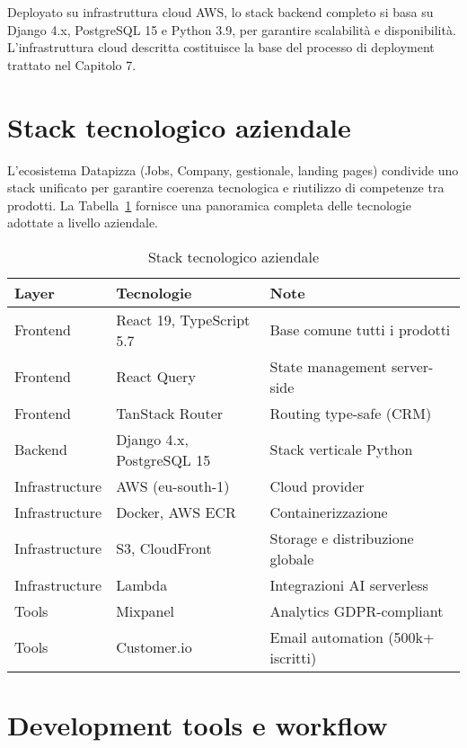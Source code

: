 Deployato su infrastruttura cloud AWS, lo stack backend completo si basa su 
Django 4.x, PostgreSQL 15 e Python 3.9, per garantire scalabilità e disponibilità. 
L'infrastruttura cloud descritta costituisce la base del processo di deployment 
trattato nel Capitolo 7.

\section{Stack tecnologico aziendale}

L'ecosistema Datapizza (Jobs, Company, gestionale, landing pages) condivide 
uno stack unificato per garantire coerenza tecnologica e riutilizzo di competenze 
tra prodotti. La Tabella~\ref{tab:stack-aziendale} fornisce una panoramica 
completa delle tecnologie adottate a livello aziendale.

\begin{table}[h]
\centering
\caption{Stack tecnologico aziendale}
\label{tab:stack-aziendale}
\begin{tabular}{|l|l|p{6.5cm}|}
\hline
\textbf{Layer} & \textbf{Tecnologie} & \textbf{Note} \\
\hline
Frontend & React 19, TypeScript 5.7 & Base comune tutti i prodotti \\
\hline
Frontend & React Query & State management server-side \\
\hline
Frontend & TanStack Router & Routing type-safe (CRM) \\
\hline
Backend & Django 4.x, PostgreSQL 15 & Stack verticale Python \\
\hline
Infrastructure & AWS (eu-south-1) & Cloud provider \\
\hline
Infrastructure & Docker, AWS ECR & Containerizzazione \\
\hline
Infrastructure & S3, CloudFront & Storage e distribuzione globale \\
\hline
Infrastructure & Lambda & Integrazioni AI serverless \\
\hline
Tools & Mixpanel & Analytics GDPR-compliant \\
\hline
Tools & Customer.io & Email automation (500k+ iscritti) \\
\hline
\end{tabular}
\end{table}

\section{Development tools e workflow}

